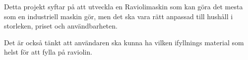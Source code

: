 Detta projekt syftar på att utveckla en Raviolimaskin som kan göra det mesta som en industriell maskin gör, men det ska vara rätt anpassad till hushåll i storleken, priset och användbarheten. 

Det är också tänkt att användaren ska kunna ha vilken ifyllnings material som helst för att fylla på raviolin.